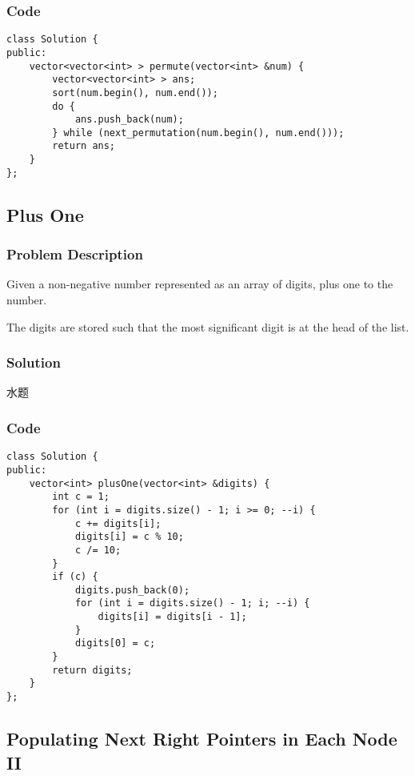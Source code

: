 \documentclass[courier]{article}
\begin{document}
\begin{CJK*}{UTF8}{gkai}
\subsubsection*{Code}
\begin{lstlisting}
class Solution {
public:
    vector<vector<int> > permute(vector<int> &num) {
        vector<vector<int> > ans;
        sort(num.begin(), num.end());
        do {
            ans.push_back(num);
        } while (next_permutation(num.begin(), num.end()));
        return ans;
    }
}; 
\end{lstlisting}


\subsection{ Plus One }

\subsubsection*{Problem Description}
Given a non-negative number represented as an array of digits, plus one to the number.

The digits are stored such that the most significant digit is at the head of the list.



\subsubsection*{Solution}
水题

\subsubsection*{Code}
\begin{lstlisting}
class Solution {
public:
    vector<int> plusOne(vector<int> &digits) {
        int c = 1;
        for (int i = digits.size() - 1; i >= 0; --i) {
            c += digits[i];
            digits[i] = c % 10;
            c /= 10;
        }
        if (c) {
            digits.push_back(0);
            for (int i = digits.size() - 1; i; --i) {
                digits[i] = digits[i - 1];
            }
            digits[0] = c;
        }
        return digits;
    }
}; 
\end{lstlisting}


\subsection{ Populating Next Right Pointers in Each Node II }


\end{CJK*}
\end{document}
